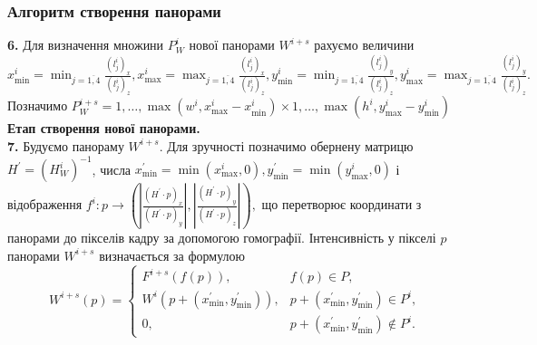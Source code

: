 \begin{frame}
    \frametitle{Алгоритм створення панорами}
    \textbf{6.}
    Для визначення множини \(P_{W}^{i}\) нової панорами \(W^{i + s}\)
    рахуємо величини
    $
        x_{\min}^{i} = \min_{j = \overline{1,4}}\frac{( l_{j}^{i} )_{x}}{( l_{j}^{i} )_{z}},
        x_{\max}^{i} = \max_{j = \overline{1,4}}\frac{( l_{j}^{i} )_{x}}{( l_{j}^{i} )_{z}},
        y_{\min}^{i} = \min_{j = \overline{1,4}}\frac{( l_{j}^{i} )_{y}}{( l_{j}^{i} )_{z}},
        y_{\max}^{i} = \max_{j = \overline{1,4}}\frac{( l_{j}^{i} )_{y}}{( l_{j}^{i} )_{z}}.
    $ \\
    Позначимо
    $
        P_{W}^{i + s} =
        { 1,\ldots,\max( w^{i},x_{\max}^{i} - x_{\min}^{i} ) }
        \times
        { 1,\ldots,\max( h^{i},y_{\max}^{i} - y_{\min}^{i} ) }
    $ \\
    \textbf{Етап створення нової панорами.} \\
    \textbf{7.}
    Будуємо панораму $W^{i+s}$. Для зручності позначимо обернену матрицю $H^{'} = (H_{W}^{i})^{-1}$, числа
    $x_{\min}^{'} = \min(x_{\max}^{i}, 0), y_{\min}^{'} = \min(y_{\max}^{i}, 0)$ і відображення
    $
        f^i: p \rightarrow
        \left( \left| \frac{(H^{'} \cdot p)_x}{(H^{'} \cdot p)_y} \right|, \left| \frac{(H^{'} \cdot p)_y}{(H^{'} \cdot p)_z} \right| \right),
    $
    що перетворює координати з панорами до пікселів кадру за допомогою гомографії.
    Інтенсивність у пікселі $p$ панорами
    $W^{i+s}$ визначається за формулою
    \begin{equation*}
        W^{i + s}(p) =
        \begin{cases}
            F^{i + s}(f(p)),                            & f(p) \in P,                                     \\
            W^{i}( p + ( x_{\min}^{'},y_{\min}^{'} ) ), & p + ( x_{\min}^{'},y_{\min}^{'} ) \in P^{i},    \\
            0,                                          & p + ( x_{\min}^{'},y_{\min}^{'} ) \notin P^{i}.
        \end{cases}
    \end{equation*}
\end{frame}

